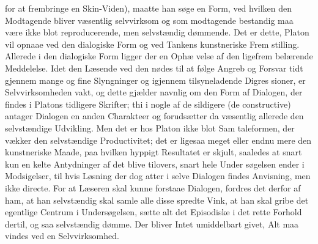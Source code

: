 \documentclass[12pt,a4paper]{book}
\begin{document}
for at frembringe en Skin-Viden), maatte han søge en Form,
ved hvilken den Modtagende bliver væsentlig selvvirksom og
som modtagende bestandig maa være ikke blot reproducerende,
men selvstændig dømmende. Det er dette, Platon vil opnaae
ved den dialogiske Form og ved Tankens kunstneriske Frem\-%
stilling. Allerede i den dialogiske Form ligger der en Ophæ\-%
velse af den ligefrem belærende Meddelelse. Idet den Læsende
ved den nødes til at følge Angreb og Forsvar tidt gjennem
mange og fine Slyngninger og igjennem tilsyneladende Digres\-%
sioner, er Selvvirksomheden vakt, og dette gjælder navnlig om
den Form af Dialogen, der findes i Platons tidligere Skrifter;
thi i nogle af de sildigere (de constructive) antager Dialogen
en anden Charakteer og forudsætter da væsentlig allerede den
selvstændige Udvikling. Men det er hos Platon ikke blot Sam\-%
taleformen, der vækker den selvstændige Productivitet; det er
ligesaa meget eller endnu mere den kunstneriske Maade, paa
hvilken hyppigt Resultatet er skjult, saaledes at snart kun en\-%
kelte Antydninger af det blive tilovers, snart hele Under\-%
søgelsen ender i Modsigelser, til hvis Løsning der dog
atter i selve Dialogen findes Anvisning, men ikke directe. For
at Læseren skal kunne forstaae Dialogen, fordres det derfor af
ham, at han selvstændig skal samle alle disse spredte Vink,
at han skal gribe det egentlige Centrum i Undersøgelsen, sætte
alt det Episodiske i det rette Forhold dertil, og saa selvstændig
dømme. Der bliver Intet umiddelbart givet, Alt maa vindes
ved en Selvvirksomhed.
\end{document}
